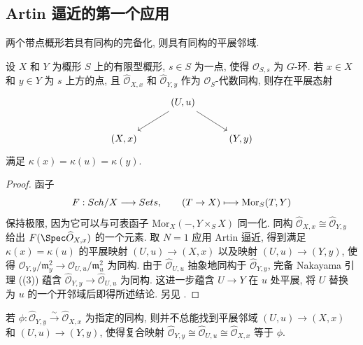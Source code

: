 \subsection{Artin 逼近的第一个应用}\label{src:B.5.6-subsection}
两个带点概形若具有同构的完备化, 则具有同构的平展邻域.
\begin{corollary}\label{src:B.5.21}
设 $X$ 和 $Y$ 为概形 $S$ 上的有限型概形, $s\in S$ 为一点, 使得 $\mathcal O_{S,s}$ 为 $G$-环. 若 $x\in X$ 和 $y\in Y$ 为 $s$ 上方的点, 且 $\widehat{\mathcal O}_{X,x}$ 和 $\widehat{\mathcal O}_{Y,y}$ 作为 $\mathcal O_S$-代数同构, 则存在平展态射
\[
\begin{tikzcd}[column sep=2.6em,row sep=2em]
&(U,u)\arrow[dl]\arrow[dr]&\\
(X,x)&&(Y,y)
\end{tikzcd}
\]
满足 $\kappa(x)=\kappa(u)=\kappa(y)$.
\end{corollary}
\begin{proof}
函子
\[
F:Sch/X\longrightarrow Sets,\qquad(T\to X)\longmapsto\mathrm{Mor}_S(T,Y)
\]
保持极限, 因为它可以与可表函子 $\mathrm{Mor}_X(-,Y\times_SX)$ 同一化. 同构 $\widehat{\mathcal O}_{X,x}\cong\widehat{\mathcal O}_{Y,y}$ 给出 $F(\Spec\widehat{\mathcal O}_{X,x})$ 的一个元素. 取 $N=1$ 应用 Artin 逼近, 得到满足 $\kappa(x)=\kappa(u)$ 的平展映射 $(U,u)\to(X,x)$ 以及映射 $(U,u)\to(Y,y)$, 使得 $\mathcal O_{Y,y}/\mathfrak m_y^2\to\mathcal O_{U,u}/\mathfrak m_u^2$ 为同构. 由于 $\widehat{\mathcal O}_{U,u}$ 抽象地同构于 $\widehat{\mathcal O}_{Y,y}$, 完备 Nakayama 引理 ((3)) 蕴含 $\widehat{\mathcal O}_{Y,y}\to\widehat{\mathcal O}_{U,u}$ 为同构. 这进一步蕴含 $U\to Y$ 在 $u$ 处平展, 将 $U$ 替换为 $u$ 的一个开邻域后即得所述结论. 另见 \cite[Tag 0CAV]{SP}.
\end{proof}
若 $\phi:\widehat{\mathcal O}_{Y,y}\xrightarrow{\sim}\widehat{\mathcal O}_{X,x}$ 为指定的同构, 则并不总能找到平展邻域 $(U,u)\to(X,x)$ 和 $(U,u)\to(Y,y)$, 使得复合映射 $\widehat{\mathcal O}_{Y,y}\cong\widehat{\mathcal O}_{U,u}\cong\widehat{\mathcal O}_{X,x}$ 等于 $\phi$.
\par\clearpage
\endgroup
